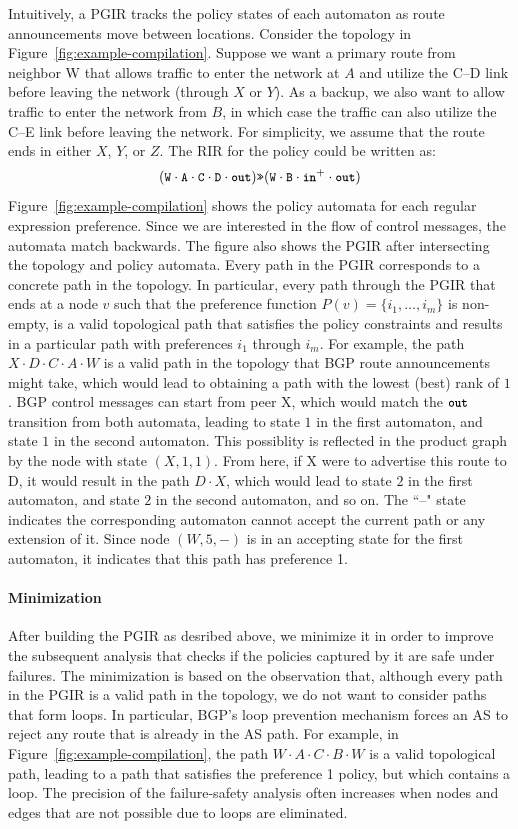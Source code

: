 \documentclass[10pt]{sigalternate052015}
\newcommand{\para}[1]{\paragraph*{\textbf{#1}}}
\newcommand{\set}[1]{\ensuremath{\{ #1 \} }}
\newcommand{\CD}[1]{\texttt{\small #1}}  %
\newcommand{\KW}[1]{\texttt{\small\bfseries{#1}}}
\newcommand{\Prefer}{\texttt{>>}}
\newcommand{\In}{\KW{in}}
\newcommand{\Out}{\KW{out}}
\begin{document}
Intuitively, a PGIR tracks the policy states of each automaton as route announcements move between locations.
%
Consider the topology in Figure~\ref{fig:example-compilation}. Suppose we want a primary route from neighbor W that allows traffic to enter the network at $A$ and utilize the C--D link before leaving the network (through $X$ or $Y$). As a backup, we also want to allow traffic to enter the network from $B$, in which case the traffic can also utilize the C--E link before leaving the network. For simplicity, we assume that the route ends in either $X$, $Y$, or $Z$. The RIR for the policy could be written as:
%
$$(\CD{W} \cdot \CD{A} \cdot \CD{C} \cdot \CD{D} \cdot \Out) \Prefer (\CD{W} \cdot \CD{B} \cdot \In^+ \cdot \Out)$$
%
Figure~\ref{fig:example-compilation} shows the policy automata for each regular expression preference. Since we are interested in the flow of control messages, the automata match backwards.
%
The figure also shows the PGIR after intersecting the topology and policy automata. Every path in the PGIR corresponds to a concrete path in the topology. In particular, every path through the PGIR that ends at a node $v$ such that the preference function $P(v) = \set{i_1, \dots, i_m}$ is non-empty, is a valid topological path that satisfies the policy constraints and results in a particular path with preferences $i_1$ through $i_m$.
%
For example, the path $X \cdot D \cdot C \cdot A \cdot W$ is a valid path in the topology that BGP route announcements might take, which would lead to obtaining a path with the lowest (best) rank of $1$.
BGP control messages can start from peer X, which would match the $\Out$ transition from both automata, leading to state $1$ in the first automaton, and state $1$ in the second automaton. This possiblity is reflected in the product graph by the node with state $(X,1,1)$. From here, if X were to advertise this route to D, it would result in the path $D \cdot X$, which would lead to state $2$ in the first automaton, and state $2$ in the second automaton, and so on.
%
The ``--" state indicates the corresponding automaton cannot accept the current path or any extension of it. Since
node $(W,5,-)$ is in an accepting state for the first automaton, it indicates that this path has preference 1.

\para{Minimization}
After building the PGIR as desribed above,
we minimize it in order to improve the subsequent analysis that checks if the policies captured by it are safe under failures.
The minimization is based on the observation that, although every path in the PGIR is a valid path in the topology, we do not want to consider paths that form loops. In particular, BGP's loop prevention mechanism forces an AS to reject any route that is already in the AS path.
%
For example, in Figure~\ref{fig:example-compilation}, the path $W \cdot A \cdot C \cdot B \cdot W$ is a valid topological path, leading to a path that satisfies the preference 1 policy, but which contains a loop.
%
The precision of the failure-safety analysis often increases when nodes and edges that are not possible due to loops are eliminated.
\end{document}
